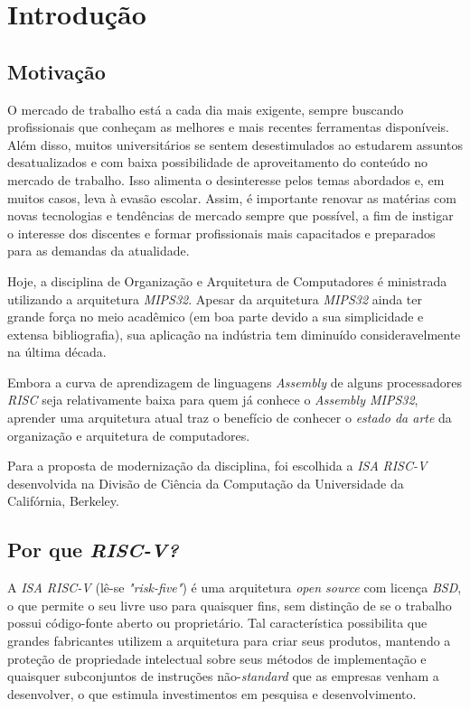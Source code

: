 \chapter{Introdução}

\label{CapIntro}



\section{Motivação}

    {O mercado de trabalho está a cada dia mais exigente, sempre buscando profissionais que conheçam as melhores e mais recentes ferramentas disponíveis. Além disso, muitos universitários se sentem desestimulados ao estudarem assuntos desatualizados e com baixa possibilidade de aproveitamento do conteúdo no mercado de trabalho. Isso alimenta o desinteresse pelos temas abordados e, em muitos casos, leva à evasão escolar. Assim, é importante renovar as matérias com novas tecnologias e tendências de mercado sempre que possível, a fim de instigar o interesse dos discentes e formar profissionais mais capacitados e preparados para as demandas da atualidade.}

    {Hoje, a disciplina de Organização e Arquitetura de Computadores é ministrada utilizando a arquitetura \textit{MIPS32}. Apesar da arquitetura \textit{MIPS32} ainda ter grande força no meio acadêmico (em boa parte devido a sua simplicidade e extensa bibliografia), sua aplicação na indústria tem diminuído consideravelmente na última década.}

    {Embora a curva de aprendizagem de linguagens \textit{Assembly} de alguns processadores \textit{RISC} seja relativamente baixa para quem já conhece o \textit{Assembly MIPS32}, aprender uma arquitetura atual traz o benefício de conhecer o \textit{estado da arte} da organização e arquitetura de computadores.}

    {Para a proposta de modernização da disciplina, foi escolhida a \textit{ISA} \textit{RISC-V} desenvolvida na Divisão de Ciência da Computação da Universidade da Califórnia, Berkeley.}

\section{Por que \textit{RISC-V?}}

    {A \textit{ISA RISC-V} (lê-se \textit{"risk-five"}) é uma arquitetura \textit{open source} com licença \textit{BSD}, o que permite o seu livre uso para quaisquer fins, sem distinção de se o trabalho possui código-fonte aberto ou proprietário. Tal característica possibilita que grandes fabricantes utilizem a arquitetura para criar seus produtos, mantendo a proteção de propriedade intelectual sobre seus métodos de implementação e quaisquer subconjuntos de instruções não-\textit{standard} que as empresas venham a desenvolver, o que estimula investimentos em pesquisa e desenvolvimento.}


